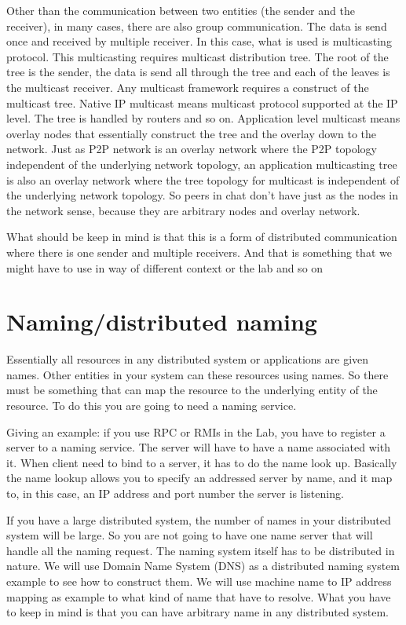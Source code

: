 \documentclass[twoside]{article}
\begin{document}
 
Other than the communication between two entities (the sender and the receiver), in many cases, there are also group communication. The data is send once and received by multiple receiver. In this case, what is used is multicasting protocol. This multicasting requires multicast distribution tree. The root of the tree is the sender, the data is send all through the tree and each of the leaves is the multicast receiver. Any multicast framework requires a construct of the multicast tree. Native IP multicast means multicast protocol supported at the IP level. The tree is handled by routers and so on. Application level multicast means overlay nodes that essentially construct the tree and the overlay down to the network. Just as P2P network is an overlay network where the P2P topology independent of the underlying network topology, an application multicasting tree is also an overlay network where the tree topology for multicast is independent of the underlying network topology. So peers in chat don’t have just as the nodes in the network sense, because they are arbitrary nodes and overlay network. 

What should be keep in mind is that this is a form of distributed communication where there is one sender and multiple receivers. And that is something that we might have to use in way of different context or the lab and so on

\section{Naming/distributed naming}
Essentially all resources in any distributed system or applications are given names. Other entities in your system can these resources using names. So there must be something that can map the resource to the underlying entity of the resource. To do this you are going to need a naming service. 

Giving an example: if you use RPC or RMIs in the Lab, you have to register a server to a naming service. The server will have to have a name associated with it. When client need to bind to a server, it has to do the name look up. Basically the name lookup allows you to specify an addressed server by name, and it map to, in this case, an IP address and port number the server is listening.

If you have a large distributed system, the number of names in your distributed system will be large. So you are not going to have one name server that will handle all the naming request. The naming system itself has to be distributed in nature. We will use Domain Name System (DNS) as a distributed naming system example to see how to construct them. We will use machine name to IP address mapping as example to what kind of name that have to resolve. What you have to keep in mind is that you can have arbitrary name in any distributed system.
\end{document}
